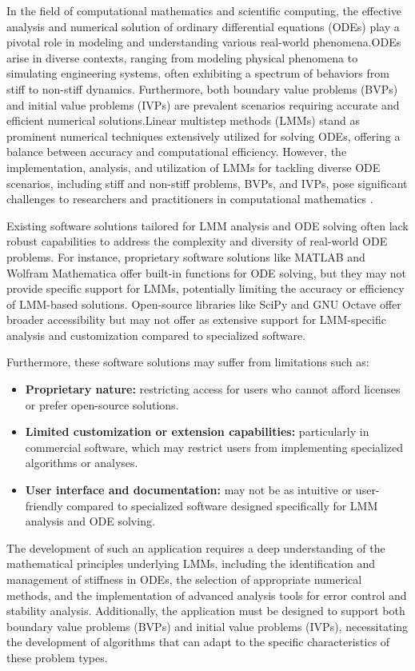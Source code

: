 In the field of computational mathematics and scientific computing, the effective analysis and numerical solution of ordinary differential equations (ODEs) play a pivotal role in modeling and understanding various real-world phenomena.ODEs arise in diverse contexts, ranging from modeling physical phenomena to simulating engineering systems, often exhibiting a spectrum of behaviors from stiff to non-stiff dynamics. Furthermore, both boundary value problems (BVPs) and initial value problems (IVPs) are prevalent scenarios requiring accurate and efficient numerical solutions.Linear multistep methods (LMMs) stand as prominent numerical techniques extensively utilized for solving ODEs, offering a balance between accuracy and computational efficiency. However, the implementation, analysis, and utilization of LMMs for tackling diverse ODE scenarios, including stiff and non-stiff problems, BVPs, and IVPs, pose significant challenges to researchers and practitioners in computational mathematics \cite{BUTCHER20091834}.

Existing software solutions tailored for LMM analysis and ODE solving often lack robust capabilities to address the complexity and diversity of real-world ODE problems. For instance, proprietary software solutions like MATLAB and Wolfram Mathematica offer built-in functions for ODE solving, but they may not provide specific support for LMMs, potentially limiting the accuracy or efficiency of LMM-based solutions. Open-source libraries like SciPy and GNU Octave offer broader accessibility but may not offer as extensive support for LMM-specific analysis and customization compared to specialized software.

Furthermore, these software solutions may suffer from limitations such as:

\begin{itemize}
    \item \textbf{Proprietary nature:} restricting access for users who cannot afford licenses or prefer open-source solutions.
    \item \textbf{Limited customization or extension capabilities:} particularly in commercial software, which may restrict users from implementing specialized algorithms or analyses.
    \item \textbf{User interface and documentation:} may not be as intuitive or user-friendly compared to specialized software designed specifically for LMM analysis and ODE solving.
\end{itemize}

The development of such an application requires a deep understanding of the mathematical principles underlying LMMs, including the identification and management of stiffness in ODEs, the selection of appropriate numerical methods, and the implementation of advanced analysis tools for error control and stability analysis. Additionally, the application must be designed to support both boundary value problems (BVPs) and initial value problems (IVPs), necessitating the development of algorithms that can adapt to the specific characteristics of these problem types.

